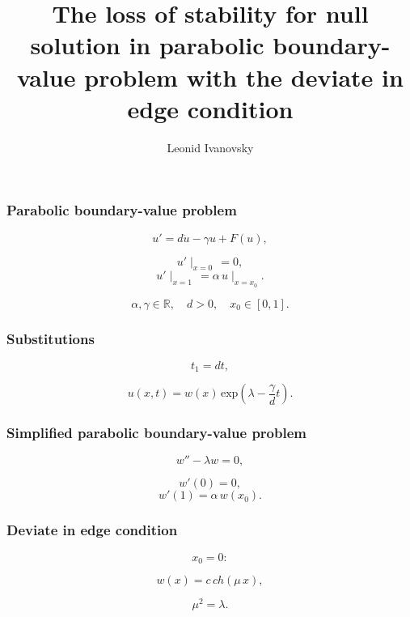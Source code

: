 \documentclass[fullscreen=true, unicode, bookmarks=false]{beamer}
\title[]{ The loss of stability for null solution in parabolic boundary-value problem with the deviate in edge condition }
\author[]{{\large Leonid Ivanovsky}}
\date{}
\institute[]
{ postgraduate student }
\begin{document}
\begin{frame}
\titlepage
\end{frame} 

\begin{frame}
\frametitle{ Parabolic boundary-value problem }
 
\begin{equation}\label{ivanovsky-eq1}
	u' = d \ddot{u} - \gamma u + F(u),
\end{equation}	
	
$$  u'\mid_{x=0} \, = 0, $$
$$ u'\mid_{x=1} \, = \alpha\,u\mid_{x=x_0}. $$

$$ \alpha, \gamma \in \mathbb{R}, \quad d > 0, \quad x_0 \in [0, 1]. $$

\end{frame}

\begin{frame}
\frametitle{ Substitutions }
	
$$ t_1 = dt, $$

\bigskip

$$ u(x, t) = w(x)\,\mbox{exp}\left( \lambda - \frac{\gamma}{d}t \right). $$

\end{frame}

\begin{frame}
\frametitle{ Simplified parabolic boundary-value problem }
	
\begin{equation}\label{ivanovsky-eq2}
	w'' - \lambda w = 0,
\end{equation}

$$ w'(0) = 0, $$
$$ w'(1) = \alpha\,w(x_0). $$

\end{frame}

\begin{frame}
\frametitle{ Deviate in edge condition }
	
$$ x_0 = 0: $$

\bigskip

$$ w(x) = c\,ch(\mu\, x), $$

\bigskip

$$ \mu^2 = \lambda. $$

\end{frame}
\end{document}
